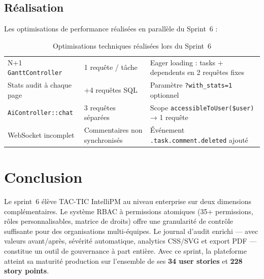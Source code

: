 \subsection{Réalisation}

Les optimisations de performance réalisées en parallèle du Sprint~6 :

\begin{table}[H]
  \centering
  \caption{Optimisations techniques réalisées lors du Sprint~6}
  \label{tab:optims_s6}
  \begin{tabularx}{\textwidth}{L{4cm}L{3cm}X}
    \toprule
     &  &  \\
    \midrule
    N+1 \texttt{GanttController}    & 1 requête / tâche &
      Eager loading : tasks + dependents en 2 requêtes fixes \\
    Stats audit à chaque page       & +4 requêtes SQL  &
      Paramètre \texttt{?with\_stats=1} optionnel \\
    \texttt{AiController::chat}     & 3 requêtes séparées &
      Scope \texttt{accessibleToUser(\$user)} → 1 requête \\
    WebSocket incomplet             & Commentaires non synchronisés &
      Événement \texttt{.task.comment.deleted} ajouté \\
    \bottomrule
  \end{tabularx}
\end{table}

\section{Conclusion}

\begin{chapconclusion}
Le sprint~6 élève TAC-TIC IntelliPM au niveau enterprise sur deux dimensions
complémentaires. Le système RBAC à permissions atomiques (35+ permissions,
rôles personnalisables, matrice de droits) offre une granularité de contrôle
suffisante pour des organisations multi-équipes. Le journal d'audit enrichi —
avec valeurs avant/après, sévérité automatique, analytics CSS/SVG et export
PDF — constitue un outil de gouvernance à part entière. Avec ce sprint, la
plateforme atteint sa maturité production sur l'ensemble de ses
\textbf{34 user stories} et \textbf{228 story points}.
\end{chapconclusion}
